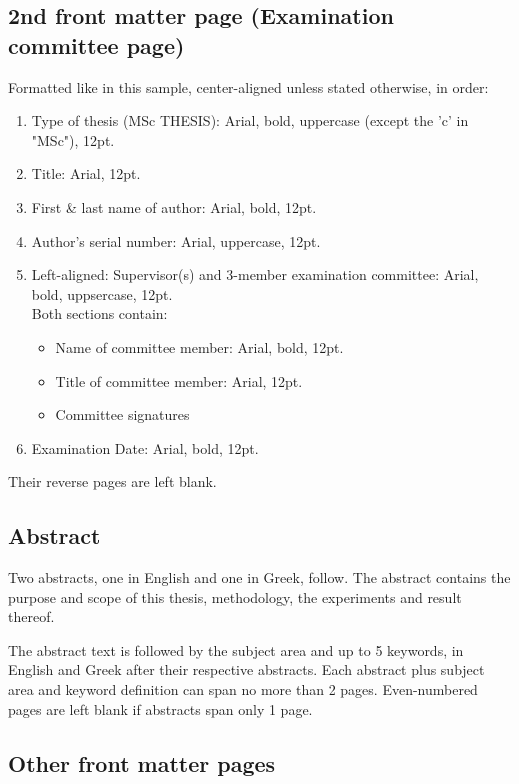 \documentclass[en,inscr,ack,preface]{dimscthesis}
\begin{document}
\subsection{2nd front matter page (Examination committee page)} \label{second_front_matter_page}

Formatted like in this sample, center-aligned unless stated otherwise, in order:

\begin{enumerate}
    \item Type of thesis (MSc THESIS): Arial, bold, uppercase (except the 'c' in "MSc"), 12pt.
    \item Title: Arial, 12pt.
    \item First \& last name of author: Arial, bold, 12pt.
    \item Author's serial number: Arial, uppercase, 12pt.
    \item Left-aligned: Supervisor(s) and 3-member examination committee: Arial, bold, uppsercase, 12pt.\\
    Both sections contain:
    \begin{itemize}
        \item Name of committee member: Arial, bold, 12pt.
        \item Title of committee member: Arial, 12pt.
        \item Committee signatures
    \end{itemize}
    \item Examination Date: Arial, bold, 12pt.
\end{enumerate}

Their reverse pages are left blank.

\subsection{Abstract} \label{abstract}

Two abstracts, one in English and one in Greek, follow.
The abstract contains the purpose and scope of this thesis, methodology, the experiments and result thereof.

The abstract text is followed by the subject area and up to 5 keywords, in English and Greek after their respective abstracts.
Each abstract plus subject area and keyword definition can span no more than 2 pages.
Even-numbered pages are left blank if abstracts span only 1 page.

\subsection{Other front matter pages} \label{other_front_matter_pages}
\end{document}
